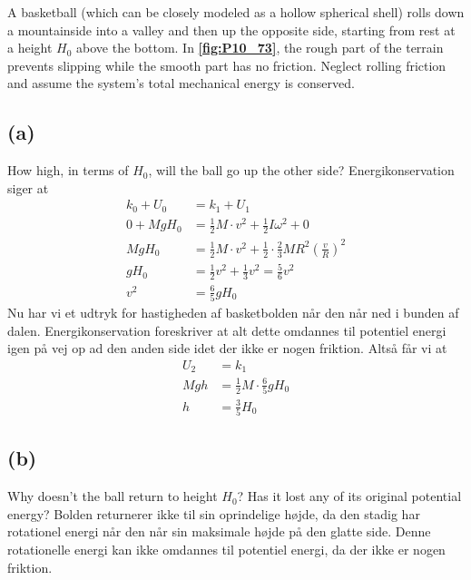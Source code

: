 \documentclass[12pt]{article}
\begin{document}
A basketball (which can be closely modeled as a hollow spherical shell) rolls down a mountainside into a valley and then up the opposite side, starting from rest at a height $H_0$ above the bottom. In \textbf{\autoref{fig:P10_73}}, the rough part of the terrain prevents slipping while the smooth part has no friction. Neglect rolling friction and assume the system’s total mechanical energy is conserved.

\subsection*{(a)}
How high, in terms of $H_0$, will the ball go up the other side?
\bigbreak
Energikonservation siger at
\begin{align*}
  k_{0} + U_{0} &= k_{1} + U_{1} \\
  0 + MgH_0 &= \frac{1}{2}M\cdot v^2 + \frac{1}{2}I\omega^2 + 0 \\
  MgH_0 &= \frac{1}{2}M\cdot v^2 + \frac{1}{2}\cdot \frac{2}{3}MR^2 \left( \frac{v}{R}  \right)^2 \\
  gH_0 &= \frac{1}{2}v^2 + \frac{1}{3}v^2 = \frac{5}{6}v^2\\
  v^2 &= \frac{6}{5}gH_0 
\end{align*}
Nu har vi et udtryk for hastigheden af basketbolden når den når ned i bunden af dalen. Energikonservation foreskriver at alt dette omdannes til potentiel energi igen på vej op ad den anden side idet der ikke er nogen friktion. Altså får vi at
\begin{align*}
  U_{2} &= k_{1} \\
  Mgh &= \frac{1}{2}M\cdot \frac{6}{5}gH_0 \\
  h &= \frac{3}{5}H_0
\end{align*}



\subsection*{(b)}
Why doesn’t the ball return to height $H_0$? Has it lost any of its original potential energy?
\bigbreak
Bolden returnerer ikke til sin oprindelige højde, da den stadig har rotationel energi når den når sin maksimale højde på den glatte side. Denne rotationelle energi kan ikke omdannes til potentiel energi, da der ikke er nogen friktion.
\end{document}
